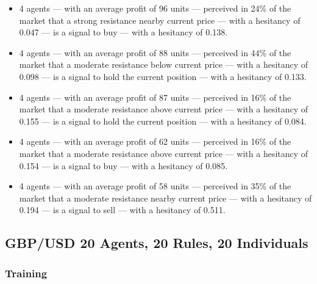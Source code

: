 {\small
  \begin{itemize}
  \item 4 agents — with an average profit of 96 units — perceived in 24\% of the
    market that a strong resistance nearby current price — with a hesitancy of
    0.047 — is a signal to buy — with a hesitancy of 0.138.
  \item 4 agents — with an average profit of 88 units — perceived in 44\% of the
    market that a moderate resistance below current price — with a hesitancy of
    0.098 — is a signal to hold the current position — with a hesitancy of
    0.133.
  \item 4 agents — with an average profit of 87 units — perceived in 16\% of the
    market that a moderate resistance above current price — with a hesitancy of
    0.155 — is a signal to hold the current position — with a hesitancy of
    0.084.
  \item 4 agents — with an average profit of 62 units — perceived in 16\% of the
    market that a moderate resistance above current price — with a hesitancy of
    0.154 — is a signal to buy — with a hesitancy of 0.085.
  \item 4 agents — with an average profit of 58 units — perceived in 35\% of the
    market that a moderate resistance nearby current price — with a hesitancy of
    0.194 — is a signal to sell — with a hesitancy of 0.511.
  \end{itemize}
}

\subsection{GBP/USD 20 Agents, 20 Rules, 20 Individuals}
\label{}

\subsubsection{Training}
\label{}


